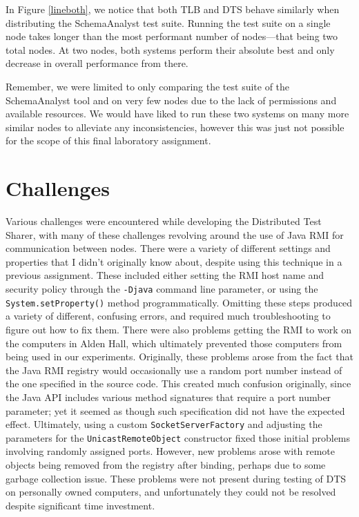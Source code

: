 \documentclass{article}
\begin{document}
{In Figure \ref{lineboth}, we notice that both TLB and DTS behave similarly when distributing the SchemaAnalyst test
suite. Running the test suite on a single node takes longer than the most performant number of nodes---that being
two total nodes. At two nodes, both systems perform their absolute best and only decrease in overall performance
from there.

Remember, we were limited to only comparing the test suite of the SchemaAnalyst tool and on very few nodes due to
the lack of permissions and available resources. We would have liked to run these two systems on many more
similar nodes to alleviate any inconsistencies, however this was just not possible for the scope of
this final laboratory assignment.

\section{Challenges}
\label{challenges}

Various challenges were encountered while developing the Distributed Test Sharer, with many of these challenges revolving around the use of Java RMI for communication between nodes.  There were a variety of different settings and properties that I didn't originally know about, despite using this technique in a previous assignment.  These included either setting the RMI host name and security policy through the \texttt{-Djava} command line parameter, or using the \texttt{System.setProperty()} method programmatically.  Omitting these steps produced a variety of different, confusing errors, and required much troubleshooting to figure out how to fix them.  There were also problems getting the RMI to work on the computers in Alden Hall, which ultimately prevented those computers from being used in our experiments.  Originally, these problems arose from the fact that the Java RMI registry would occasionally use a random port number instead of the one specified in the source code.  This created much confusion originally, since the Java API includes various method signatures that require a port number parameter; yet it seemed as though such specification did not have the expected effect.  Ultimately, using a custom \texttt{SocketServerFactory} and adjusting the parameters for the \texttt{UnicastRemoteObject} constructor fixed those initial problems involving randomly assigned ports.  However, new problems arose with remote objects being removed from the registry after binding, perhaps due to some garbage collection issue.  These problems were not present during testing of DTS on personally owned computers, and unfortunately they could not be resolved despite significant time investment.

}
\end{document}
